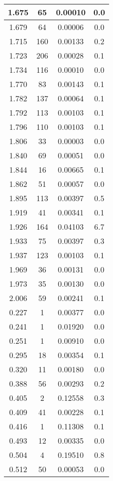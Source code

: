 \begin{longtable}{c | c | c | c}
1.675 &   65 & 0.00010 &  0.0 \\ \hline 
1.679 &   64 & 0.00006 &  0.0 \\ \hline 
1.715 &  160 & 0.00133 &  0.2 \\ \hline 
1.723 &  206 & 0.00028 &  0.1 \\ \hline 
1.734 &  116 & 0.00010 &  0.0 \\ \hline 
1.770 &   83 & 0.00143 &  0.1 \\ \hline 
1.782 &  137 & 0.00064 &  0.1 \\ \hline 
1.792 &  113 & 0.00103 &  0.1 \\ \hline 
1.796 &  110 & 0.00103 &  0.1 \\ \hline 
1.806 &   33 & 0.00003 &  0.0 \\ \hline 
1.840 &   69 & 0.00051 &  0.0 \\ \hline 
1.844 &   16 & 0.00665 &  0.1 \\ \hline 
1.862 &   51 & 0.00057 &  0.0 \\ \hline 
1.895 &  113 & 0.00397 &  0.5 \\ \hline 
1.919 &   41 & 0.00341 &  0.1 \\ \hline 
1.926 &  164 & 0.04103 &  6.7 \\ \hline 
1.933 &   75 & 0.00397 &  0.3 \\ \hline 
1.937 &  123 & 0.00103 &  0.1 \\ \hline 
1.969 &   36 & 0.00131 &  0.0 \\ \hline 
1.973 &   35 & 0.00130 &  0.0 \\ \hline 
2.006 &   59 & 0.00241 &  0.1 \\ \hline 
0.227 &    1 & 0.00377 &  0.0 \\ \hline 
0.241 &    1 & 0.01920 &  0.0 \\ \hline 
0.251 &    1 & 0.00910 &  0.0 \\ \hline 
0.295 &   18 & 0.00354 &  0.1 \\ \hline 
0.320 &   11 & 0.00180 &  0.0 \\ \hline 
0.388 &   56 & 0.00293 &  0.2 \\ \hline 
0.405 &    2 & 0.12558 &  0.3 \\ \hline 
0.409 &   41 & 0.00228 &  0.1 \\ \hline 
0.416 &    1 & 0.11308 &  0.1 \\ \hline 
0.493 &   12 & 0.00335 &  0.0 \\ \hline 
0.504 &    4 & 0.19510 &  0.8 \\ \hline 
0.512 &   50 & 0.00053 &  0.0 \\ \hline 

\end{longtable}
